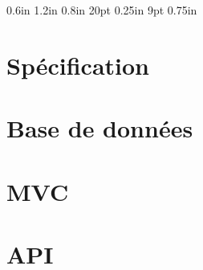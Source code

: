 \documentclass[12pt,oneside]{report}
\newcommand{\hsp}{\hspace{20pt}}
\begin{document}
\setmarginsrb{ 1.2in}   %
             { 0.6in}   %
             { 1.2in}   %
             { 0.8in}   %
             {  20pt}   %
             {0.25in}   %
             { 9pt}     %
             { 0.75in}  %


\titleformat{\chapter}[hang]{\Huge\bfseries}{\thechapter\hsp\textcolor{gray75}{|}\hsp}{0pt}{\Huge\bfseries}




\tableofcontents

\chapter{Spécification}
\label{chap:Spécification}

	\vspace{\baselineskip}
	

\chapter{Base de données}
\label{chap:Base de donnée}

	\vspace{\baselineskip}
	

\chapter{MVC}
\label{chap:MVC}

	\vspace{\baselineskip}
	

\chapter{API}
\label{chap:API}


	\vspace{\baselineskip}
	
\end{document}
